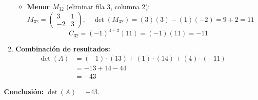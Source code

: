 \begin{example}
\begin{myproof}
\begin{enumerate}
\begin{itemize}
\item \textbf{Menor $M_{32}$} (eliminar fila 3, columna 2):
\[
M_{32} = \begin{pmatrix}
3 & 1 \\
-2 & 3
\end{pmatrix}, \quad
\det(M_{32}) = (3)(3) - (1)(-2) = 9 + 2 = 11
\]
\[
C_{32} = (-1)^{3+2}(11) = (-1)(11) = -11
\]
\end{itemize}

\item \textbf{Combinación de resultados:}
\begin{align*}
\det(A) &= (-1)\cdot(13) + (1)\cdot(14) + (4)\cdot(-11) \\
&= -13 + 14 - 44 \\
&= -43
\end{align*}
\end{enumerate}

\textbf{Conclusión:} $\det(A) = -43$.
\end{myproof}
\end{example}



